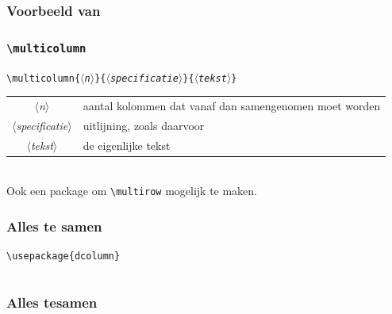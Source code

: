 \begin{frame}[fragile]
  \frametitle{Voorbeeld van }

  
\end{frame}

\begin{frame}[fragile]
  \frametitle{\texttt{\textbackslash multicolumn}}

  \small
  \texttt{\textcolor{uagreen}{\textbackslash multicolumn}\{$\langle$\textsl{n}$\rangle$\}\{$\langle$\textsl{specificatie}$\rangle$\}\{$\langle$\textsl{tekst}$\rangle$\}} \\[1em]

  \begin{tabular}{cl}
    $\langle$\textsl{n}$\rangle$ & aantal kolommen dat vanaf dan samengenomen moet worden \\
    $\langle$\textsl{specificatie}$\rangle$ & uitlijning, zoals daarvoor \\
    $\langle$\textsl{tekst}$\rangle$ & de eigenlijke tekst \\
  \end{tabular} \\[2em]

  Ook een package  om \texttt{\textcolor{uagreen}{\textbackslash multirow}} mogelijk te maken.
\end{frame}

\begin{frame}[fragile]
  \frametitle{Alles te samen}

  \scriptsize
  \begin{verbatim}
\usepackage{dcolumn}
  \end{verbatim}
  \inputminted{tex}{table-example-2.tex}
\end{frame}

\begin{frame}
  \frametitle{Alles tesamen}

  
\end{frame}
